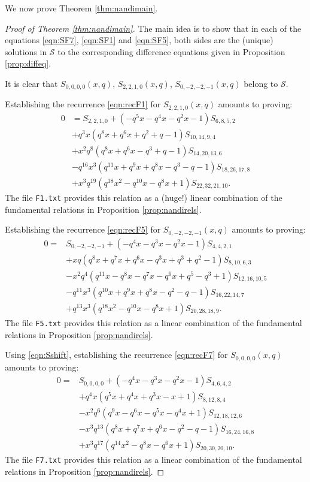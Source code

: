 \documentclass[ALCO,Unicode,published]{cedram}
\newcommand{\sS}{\mathscr{S}}
\begin{document}
We now prove Theorem \ref{thm:nandimain}.
\begin{proof}[Proof of Theorem \ref{thm:nandimain}]
The main idea is to show that in each of the equations \eqref{eqn:SF7}, \eqref{eqn:SF1} and \eqref{eqn:SF5},
both sides are the (unique) solutions in $\sS$ to the corresponding 
difference equations given in Proposition \ref{prop:diffeq}.

It is clear that $S_{0,0,0,0}(x,q)$, $S_{2,2,1,0}(x,q)$, $S_{0,-2,-2,-1}(x,q)$ belong to $\sS$.

Establishing the recurrence \eqref{eqn:recF1} for $S_{2,2,1,0}(x,q)$ amounts to proving:
\begin{align}
    0&=S_{2,2, 1, 0} 
    +(-q^5x-q^4x-q^2x-1)S_{6, 8, 5, 2}\nonumber\\
    &+q^3x(q^8x+q^6x+q^2+q-1)S_{10, 14, 9, 4}
    \nonumber\\
    &+x^2q^8(q^8x+q^6x-q^3+q-1)S_{14, 20, 13, 6}\nonumber\\
    &-q^{16}x^3(q^{11}x+q^9x+q^8x-q^3-q-1)S_{18, 26, 17, 8}
    \nonumber\\
    &+x^3q^{19}(q^{18}x^2-q^{10}x-q^8x+1)S_{22, 32, 21, 10}
    \label{eqn:recS_F1}.
\end{align}
The file \texttt{F1.txt} provides this relation as a 
(huge!) linear combination of the fundamental relations in Proposition \ref{prop:nandirels}.

Establishing the recurrence \eqref{eqn:recF5} for $S_{0,-2,-2,-1}(x,q)$ amounts to proving:
\begin{align}
    0 =&  
    S_{0, -2, -2, -1}
    +(-q^4x-q^3x-q^2x-1)S_{4, 4, 2, 1}\nonumber\\
    &+xq(q^8x+q^7x+q^6x-q^3x+q^3+q^2-1)S_{8, 10, 6, 3}
    \nonumber\\
    &-x^2q^4(q^{11}x-q^8x-q^7x-q^6x+q^5-q^3+1)S_{12, 16, 10, 5}
    \nonumber\\
    &-q^{11}x^3(q^{10}x+q^9x+q^8x-q^2-q-1)S_{16, 22, 14, 7}
    \nonumber\\
    &+q^{13}x^3(q^{18}x^2-q^{10}x-q^8x+1)S_{20, 28, 18, 9}
    \label{eqn:recS_F5}.
\end{align}
The file \texttt{F5.txt} provides this relation as a 
linear combination of the fundamental relations in Proposition \ref{prop:nandirels}.

Using \eqref{eqn:Sshift}, establishing the recurrence \eqref{eqn:recF7} for $S_{0,0,0,0}(x,q)$ amounts to proving:
\begin{align}
    0 =&  
    S_{0, 0, 0, 0}
	+(-q^4x-q^3x-q^2x-1)S_{4,6,4,2}\nonumber\\
	&+q^4x(q^5x+q^4x+q^3x-x+1)S_{8, 12, 8, 4}
	\nonumber\\
	&-x^2q^6(q^9x-q^6x-q^5x-q^4x+1)S_{12, 18, 12, 6}\nonumber\\
	&-x^3q^{13}(q^8x+q^7x+q^6x-q^2-q-1)S_{16, 24, 16, 8}
	\nonumber\\
	&
	+x^3q^{17}(q^{14}x^2-q^8x-q^6x+1)S_{20, 30, 20, 10}
    \label{eqn:recS_F7}.
\end{align}
The file \texttt{F7.txt} provides this relation as a 
linear combination of the fundamental relations in Proposition \ref{prop:nandirels}.


\end{proof}
\end{document}
